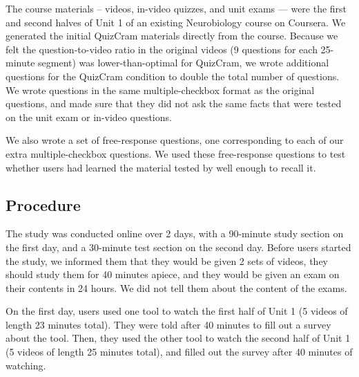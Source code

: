\documentclass{sigchi}
\begin{document}
The course materials -- videos, in-video quizzes, and unit exams --- were the first and second halves of Unit 1 of an existing Neurobiology course on Coursera. We generated the initial QuizCram materials directly from the course. Because we felt the question-to-video ratio in the original videos (9 questions for each 25-minute segment) was lower-than-optimal for QuizCram, we wrote additional questions for the QuizCram condition to double the total number of questions. We wrote questions in the same multiple-checkbox format as the original questions, and made sure that they did not ask the same facts that were tested on the unit exam or in-video questions.

We also wrote a set of free-response questions, one corresponding to each of our extra multiple-checkbox questions. We used these free-response questions to test whether users had learned the material tested by well enough to recall it.


\subsection{Procedure}

The study was conducted online over 2 days, with a 90-minute study section on the first day, and a 30-minute test section on the second day. Before users started the study, we informed them that they would be given 2 sets of videos, they should study them for 40 minutes apiece, and they would be given an exam on their contents in 24 hours. We did not tell them about the content of the exams.

On the first day, users used one tool to watch the first half of Unit 1 (5 videos of length 23 minutes total). They were told after 40 minutes to fill out a survey about the tool. Then, they used the other tool to watch the second half of Unit 1 (5 videos of length 25 minutes total), and filled out the survey after 40 minutes of watching.
\end{document}
